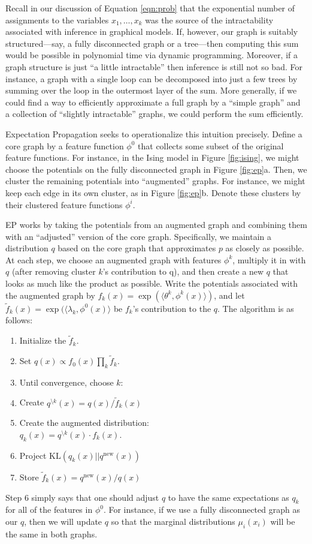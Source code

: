 \documentclass[times, 10pt,twocolumn]{article}
\newcommand{\bs}[0]{\textrm{\textbackslash}}
\begin{document}
Recall in our discussion of Equation \ref{eqn:prob} that the
exponential number of assignments to the variables $x_1,\ldots,x_k$
was the source of the intractability associated with inference in
graphical models. If, however, our graph is suitably structured---say,
a fully disconnected graph or a tree---then computing this sum would
be possible in polynomial time via dynamic programming. Moreover,
if a graph structure is just ``a little intractable'' then inference
is still not so bad. For instance, a graph with a single loop can
be decomposed into just a few trees by summing over the loop in the
outermost layer of the sum. More generally, if we could find a way
to efficiently approximate a full graph by a ``simple graph'' and a
collection of ``slightly intractable'' graphs, we could perform the
sum efficiently.

Expectation Propagation\cite{Minka01} seeks to operationalize this
intuition precisely. Define a core graph by a feature function
$\phi^0$ that collects some subset of the original feature
functions. For instance, in the Ising model in Figure
\ref{fig:ising}, we might choose the potentials on the fully
disconnected graph in Figure \ref{fig:ep}a. Then, we cluster the
remaining potentials into ``augmented'' graphs. For instance, we
might keep each edge in its own cluster, as in Figure
\ref{fig:ep}b. Denote these clusters by their clustered feature
functions $\phi^i$.

EP works by taking the potentials from an augmented graph and
combining them with an ``adjusted'' version of the core graph.
Specifically, we maintain a distribution $q$ based on the core graph
that approximates $p$ as closely as possible. At each step, we
choose an augmented graph with features $\phi^k$, multiply it in
with $q$ (after removing cluster $k$'s contribution to q), and then
create a new $q$ that looks as much like the product as possible.
Write the potentials associated with the augmented graph by $f_k(x)
= \exp( \langle \theta^k, \phi^k(x) \rangle )$, and let
$\tilde f_k(x) = \exp( \langle \lambda_k, \phi^0(x)\rangle$ be
$f_k$'s contribution to the $q$. The algorithm is as follows:
\begin{enumerate}
  \item Initialize the $\tilde f_k$.
  \item Set $q(x) \propto f_0(x) \prod_k \tilde f_k$.
  \item Until convergence, choose $k$:
  \item Create $q^{\bs k}(x) = q(x) / \tilde f_k(x)$
  \item Create the augmented distribution:\\
    $q_k(x) = q^{\bs k}(x)\cdot f_k(x)$.
  \item Project $\mathrm{KL}\left (q_k(x) || q^{\textrm{new}}(x)
    \right )$
  \item Store $\tilde f_k(x) = q^{\textrm{new}}(x)/q(x)$
\end{enumerate}
Step 6 simply says that one should adjust $q$ to have the same
expectations as $q_k$ for all of the features in $\phi^0$. For
instance, if we use a fully disconnected graph as our $q$, then we
will update $q$ so that the marginal distributions $\mu_i(x_i)$
will be the same in both graphs.
\end{document}
